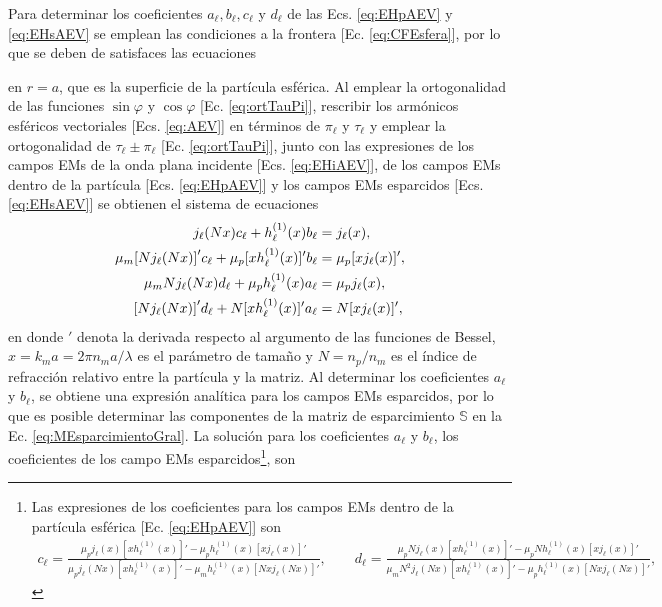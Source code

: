 Para determinar los coeficientes $a_\ell,b_\ell,c_\ell$ y $d_\ell$ de las Ecs. \eqref{eq:EHpAEV} y \eqref{eq:EHsAEV} se emplean las condiciones a la frontera [Ec. \eqref{eq:CFEsfera}], por lo que se deben de satisfaces las ecuaciones

	\vspace*{-1em}

\noindent
en $r =a$, que es la superficie de la partícula esférica. Al emplear la ortogonalidad de las funciones $\sin\varphi$ y $\cos\varphi$ [Ec. \eqref{eq:ortTauPi}], rescribir los armónicos esféricos vectoriales [Ecs. \eqref{eq:AEV}] en términos de $\pi_\ell$ y $\tau_\ell$ y emplear la ortogonalidad de $\tau_\ell\pm\pi_\ell$ [Ec. \eqref{eq:ortTauPi}], junto con las expresiones de los campos EMs de la onda plana incidente [Ecs. \eqref{eq:EHiAEV}], de los campos EMs dentro de la partícula [Ecs. \eqref{eq:EHpAEV}] y los campos EMs esparcidos [Ecs. \eqref{eq:EHsAEV}] se obtienen el sistema de ecuaciones
	\begin{align*}
	j_\ell(Nx)c_\ell + h_\ell^{(1)}(x)b_\ell &= j_\ell(x),\\
	\mu_m\qty[Nj_\ell(Nx)]'c_\ell + \mu_p [xh_\ell^{(1)}(x)]'b_\ell &= \mu_p [xj_\ell(x)]',\\
	\mu_m N j_\ell(Nx)d_\ell +\mu_p h_\ell^{(1)}(x)a_\ell &=\mu_p j_\ell(x),\\
	\qty[Nj_\ell(Nx)]'d_\ell + N [xh_\ell^{(1)}(x)]'a_\ell &= N [xj_\ell(x)]',
	\end{align*}
en donde $'$ denota la derivada respecto al argumento de las funciones de Bessel, $x = k_m a = 2 \pi n_m a /\lambda$ es el parámetro de tamaño y $N = n_p / n_m$ es el índice de refracción relativo entre la partícula y la matriz. Al determinar los coeficientes $a_\ell$ y $b_\ell$, se obtiene una expresión analítica para los campos EMs esparcidos, por lo que es posible determinar las componentes de la matriz de esparcimiento $\mathbb{S}$ en la Ec. \eqref{eq:MEsparcimientoGral}. La solución para los coeficientes $a_\ell$ y $b_\ell$, los coeficientes de los campo EMs esparcidos\footnote{Las expresiones de los coeficientes para los campos EMs dentro de la partícula esférica [Ec. \eqref{eq:EHpAEV}] son
	\begin{align*}
	c_\ell = \frac{\mu_p j_\ell(x)[xh_\ell^{(1)}(x)]' - \mu_p h_\ell^{(1)}(x) [xj_\ell(x)]'}
				{\mu_pj_\ell(Nx) [xh_\ell^{(1)}(x)]'-\mu_m h_\ell^{(1)}(x) [N x j_\ell(Nx)]' },
	\qquad	
	d_\ell = \frac{\mu_p N j_\ell(x)[xh_\ell^{(1)}(x)]' - \mu_p N h_\ell^{(1)}(x) [xj_\ell(x)]'}
				{\mu_m N^2 j_\ell(Nx) [xh_\ell^{(1)}(x)]'-\mu_p h_\ell^{(1)}(x) [N x j_\ell(Nx)]' }	,
	\end{align*}}, son
